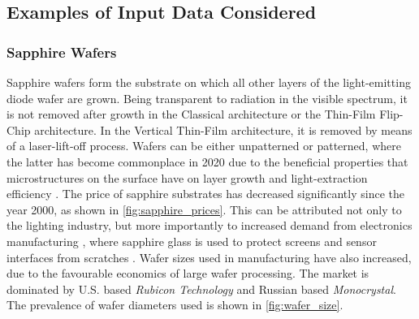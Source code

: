 \documentclass[10pt]{article}
\begin{document}
\subsection{Examples of Input Data Considered}

\subsubsection{Sapphire Wafers}

Sapphire wafers form the substrate on which all other layers of the light-emitting diode wafer are grown. Being transparent to radiation in the visible spectrum, it is not removed after growth in the Classical architecture or the Thin-Film Flip-Chip architecture. In the Vertical Thin-Film architecture, it is removed by means of a laser-lift-off process. Wafers can be either unpatterned or patterned, where the latter has become commonplace in 2020 due to the beneficial properties that microstructures on the surface have on layer growth \cite{wuu2009defect} and light-extraction efficiency \cite{lee2006enhancing}. The price of sapphire substrates has decreased significantly since the year 2000, as shown in  \cref{fig:sapphire_prices}. This can be attributed not only to the lighting industry, but more importantly to increased demand from electronics manufacturing \cite{yole2015sapphire}, where sapphire glass is used to protect screens and sensor interfaces from scratches \cite{khattak2016world}. Wafer sizes used in manufacturing have also increased, due to the favourable economics of large wafer processing. The market is dominated by U.S. based \textit{Rubicon Technology} and Russian based \textit{Monocrystal}. The prevalence of wafer diameters used is shown in  \cref{fig:wafer_size}.
\end{document}
